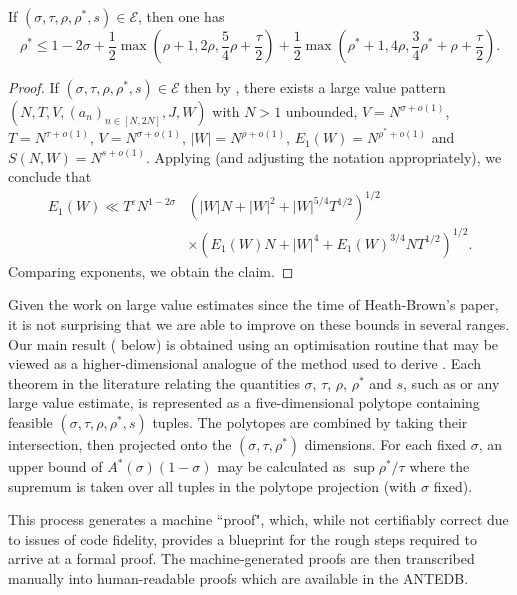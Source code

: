 \documentclass[a4paper, 10pt]{amsart}
\newcommand{\eps}{\varepsilon}
\newcommand{\Energy}{\mathcal{E}}
\begin{document}
\begin{theorem}\label{hbt}\cite{heathbrown_zero_1979} If $(\sigma,\tau,\rho,\rho^*,s) \in \Energy$, then one has
    $$ \rho^* \leq 1-2\sigma + \frac{1}{2}\max\left(\rho+1, 2\rho, \frac{5}{4}\rho+\frac{\tau}{2}\right) + \frac{1}{2}\max\left(\rho^*+1, 4\rho, \frac{3}{4}\rho^*+\rho+\frac{\tau}{2}\right).$$
    \end{theorem}


\begin{proof} If $(\sigma,\tau,\rho,\rho^*,s)\in\Energy$ then by , there exists a large value pattern $(N,T,V,(a_n)_{n \in [N,2N]},J,W)$ with $N>1$ unbounded, $V = N^{\sigma+o(1)}$, $T = N^{\tau+o(1)}$, $V = N^{\sigma+o(1)}$, $|W| = N^{\rho+o(1)}$, $E_1(W) = N^{\rho^*+o(1)}$ and $S(N,W) = N^{s+o(1)}$.  Applying \cite[(33)]{heathbrown_zero_1979} (and adjusting the notation appropriately), we conclude that
\begin{align*}
E_1(W) \ll T^\eps N^{1-2\sigma} &(|W|N + |W|^2 + |W|^{5/4} T^{1/2})^{1/2} \\
&\times (E_1(W)N + |W|^4 + E_1(W)^{3/4} N T^{1/2})^{1/2}.
\end{align*}
Comparing exponents, we obtain the claim.
\end{proof}

Given the work on large value estimates since the time of Heath-Brown's paper, it is not surprising that we are able to improve on these bounds in several ranges.  Our main result ( below) is obtained using an optimisation routine that may be viewed as a higher-dimensional analogue of the method used to derive . Each theorem in the literature relating the quantities $\sigma$, $\tau$, $\rho$, $\rho^*$ and $s$, such as  or any large value estimate, is represented as a five-dimensional polytope containing feasible $(\sigma, \tau, \rho, \rho^*, s)$ tuples. The polytopes are combined by taking their intersection, then projected onto the $(\sigma, \tau, \rho^*)$ dimensions. For each fixed $\sigma$, an upper bound of $A^*(\sigma)(1-\sigma)$ may be calculated as $\sup \rho^*/\tau$ where the supremum is taken over all tuples in the polytope projection (with $\sigma$ fixed). 

This process generates a machine ``proof", which, while not certifiably correct due to issues of code fidelity, provides a blueprint for the rough steps required to arrive at a formal proof. The machine-generated proofs are then transcribed manually into human-readable proofs which are available in the ANTEDB. 
\end{document}
